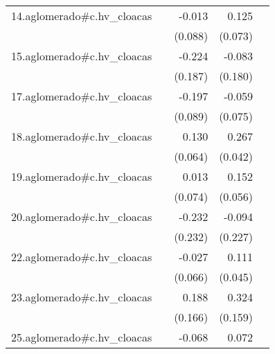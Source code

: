 {\begin{longtable}{l*{4}{D{.}{.}{-1}}}
\addlinespace
14.aglomerado#c.hv\_cloacas&                     &      -0.013         &       0.125         &                     \\
            &                     &     (0.088)         &     (0.073)         &                     \\
\addlinespace
15.aglomerado#c.hv\_cloacas&                     &      -0.224         &      -0.083         &                     \\
            &                     &     (0.187)         &     (0.180)         &                     \\
\addlinespace
17.aglomerado#c.hv\_cloacas&                     &      -0.197\sym{*}  &      -0.059         &                     \\
            &                     &     (0.089)         &     (0.075)         &                     \\
\addlinespace
18.aglomerado#c.hv\_cloacas&                     &       0.130\sym{*}  &       0.267\sym{***}&                     \\
            &                     &     (0.064)         &     (0.042)         &                     \\
\addlinespace
19.aglomerado#c.hv\_cloacas&                     &       0.013         &       0.152\sym{**} &                     \\
            &                     &     (0.074)         &     (0.056)         &                     \\
\addlinespace
20.aglomerado#c.hv\_cloacas&                     &      -0.232         &      -0.094         &                     \\
            &                     &     (0.232)         &     (0.227)         &                     \\
\addlinespace
22.aglomerado#c.hv\_cloacas&                     &      -0.027         &       0.111\sym{*}  &                     \\
            &                     &     (0.066)         &     (0.045)         &                     \\
\addlinespace
23.aglomerado#c.hv\_cloacas&                     &       0.188         &       0.324\sym{*}  &                     \\
            &                     &     (0.166)         &     (0.159)         &                     \\
\addlinespace
25.aglomerado#c.hv\_cloacas&                     &      -0.068         &       0.072         &                     \\

\end{longtable}}
